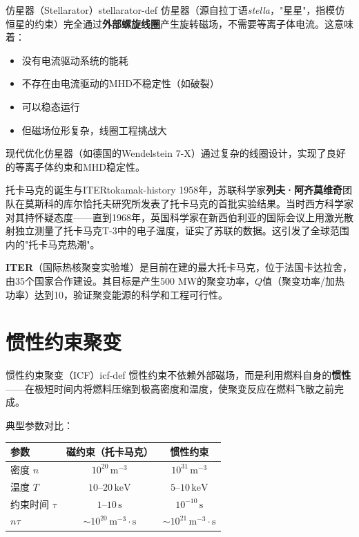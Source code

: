\documentclass[12pt,a4paper,openany,oneside]{book}
\newcommand{\difficulty}[1]{\marginnote{\textcolor{red}{\textbf{[#1]}}}}
\begin{document}
\begin{definition}{仿星器（Stellarator）}{stellarator-def}
仿星器（源自拉丁语\textit{stella}，"星星"，指模仿恒星的约束）完全通过\textbf{外部螺旋线圈}产生旋转磁场，不需要等离子体电流。这意味着：
\begin{itemize}
\item 没有电流驱动系统的能耗
\item 不存在由电流驱动的MHD不稳定性（如破裂）
\item 可以稳态运行
\item 但磁场位形复杂，线圈工程挑战大
\end{itemize}
现代优化仿星器（如德国的Wendelstein 7-X）通过复杂的线圈设计，实现了良好的等离子体约束和MHD稳定性。
\end{definition}

\begin{history}{托卡马克的诞生与ITER}{tokamak-history}
1958年，苏联科学家\textbf{列夫·阿齐莫维奇}团队在莫斯科的库尔恰托夫研究所发表了托卡马克的首批实验结果。当时西方科学家对其持怀疑态度——直到1968年，英国科学家在新西伯利亚的国际会议上用激光散射独立测量了托卡马克T-3中的电子温度，证实了苏联的数据。这引发了全球范围内的"托卡马克热潮"。

\textbf{ITER}（国际热核聚变实验堆）是目前在建的最大托卡马克，位于法国卡达拉舍，由35个国家合作建设。其目标是产生500 MW的聚变功率，$Q$值（聚变功率/加热功率）达到10，验证聚变能源的科学和工程可行性。
\end{history}

\section{惯性约束聚变}\difficulty{基础}

\begin{definition}{惯性约束聚变（ICF）}{icf-def}
惯性约束不依赖外部磁场，而是利用燃料自身的\textbf{惯性}——在极短时间内将燃料压缩到极高密度和温度，使聚变反应在燃料飞散之前完成。

典型参数对比：
\begin{center}
\begin{tabular}{lcc}
\toprule
\textbf{参数} & \textbf{磁约束（托卡马克）} & \textbf{惯性约束} \\
\midrule
密度 $n$ & $10^{20}\,\mathrm{m}^{-3}$ & $10^{31}\,\mathrm{m}^{-3}$ \\
温度 $T$ & $10$--$20\,\mathrm{keV}$ & $5$--$10\,\mathrm{keV}$ \\
约束时间 $\tau$ & $1$--$10\,\mathrm{s}$ & $10^{-10}\,\mathrm{s}$ \\
$n\tau$ & $\sim 10^{20}\,\mathrm{m}^{-3}\cdot\mathrm{s}$ & $\sim 10^{21}\,\mathrm{m}^{-3}\cdot\mathrm{s}$ \\
\bottomrule
\end{tabular}
\end{center}
\end{definition}
\end{document}
